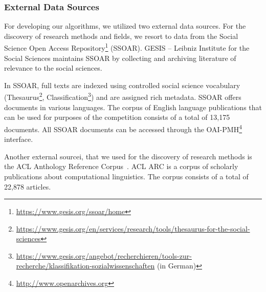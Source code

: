\subsubsection{External Data Sources}
\label{sec:external_data_sources}
For developing our algorithms, we utilized two external data sources.
For the discovery of research methods and fields, we resort to data from the Social Science Open Access Repository\footnote{\url{https://www.gesis.org/ssoar/home}} (SSOAR). 
GESIS – Leibniz Institute for the Social Sciences maintains  SSOAR by collecting and archiving literature of relevance to the social sciences. 

In SSOAR, full texts are indexed using controlled social science vocabulary (Thesaurus\footnote{\url{https://www.gesis.org/en/services/research/tools/thesaurus-for-the-social-sciences}}, Classification\footnote{\url{https://www.gesis.org/angebot/recherchieren/tools-zur-recherche/klassifikation-sozialwissenschaften} (in German)}) and are assigned rich metadata. SSOAR offers documents in various languages. The corpus of English language publications that can be used for purposes of the competition consists of a total of 13,175 documents. All SSOAR documents can be accessed through the OAI-PMH\footnote{{\url{http://www.openarchives.org}}} interface. 

Another external sourcei, that we used for the discovery of research methods is the ACL Anthology Reference Corpus~\cite{bird2008acl}. ACL ARC is a corpus of scholarly publications about computational linguistics.  
The corpus consists of a total of 22,878 articles.


